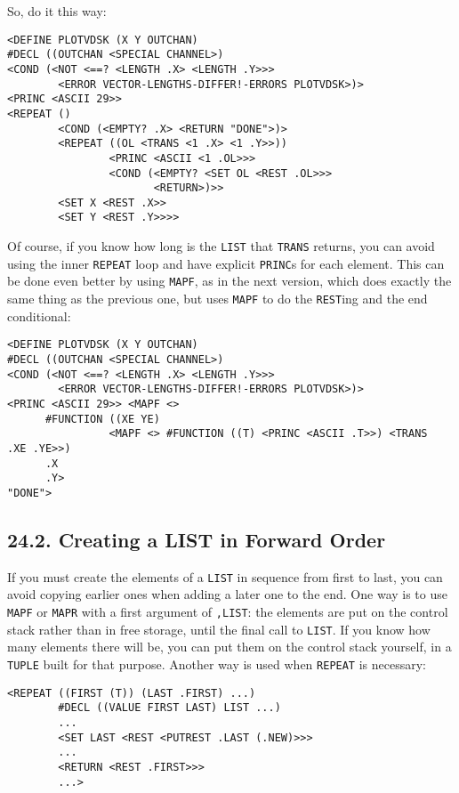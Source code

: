 \documentclass[a4paper,]{article}
\begin{document}
So, do it this way:

\begin{verbatim}
<DEFINE PLOTVDSK (X Y OUTCHAN)
#DECL ((OUTCHAN <SPECIAL CHANNEL>)
<COND (<NOT <==? <LENGTH .X> <LENGTH .Y>>>
        <ERROR VECTOR-LENGTHS-DIFFER!-ERRORS PLOTVDSK>)>
<PRINC <ASCII 29>>
<REPEAT ()
        <COND (<EMPTY? .X> <RETURN "DONE">)>
        <REPEAT ((OL <TRANS <1 .X> <1 .Y>>))
                <PRINC <ASCII <1 .OL>>>
                <COND (<EMPTY? <SET OL <REST .OL>>>
                       <RETURN>)>>
        <SET X <REST .X>>
        <SET Y <REST .Y>>>>
\end{verbatim}

Of course, if you know how long is the \texttt{LIST} that \texttt{TRANS} returns, you can avoid using the inner
\texttt{REPEAT} loop and have explicit \texttt{PRINC}s for each element. This can be done even better by using
\texttt{MAPF}, as in the next version, which does exactly the same thing as the previous one, but uses \texttt{MAPF} to do
the \texttt{REST}ing and the end conditional:

\begin{verbatim}
<DEFINE PLOTVDSK (X Y OUTCHAN)
#DECL ((OUTCHAN <SPECIAL CHANNEL>)
<COND (<NOT <==? <LENGTH .X> <LENGTH .Y>>>
        <ERROR VECTOR-LENGTHS-DIFFER!-ERRORS PLOTVDSK>)>
<PRINC <ASCII 29>> <MAPF <>
      #FUNCTION ((XE YE)
                <MAPF <> #FUNCTION ((T) <PRINC <ASCII .T>>) <TRANS
.XE .YE>>)
      .X
      .Y>
"DONE">
\end{verbatim}

\subsection{24.2. Creating a LIST in Forward Order}\label{creating-a-list-in-forward-order}

If you must create the elements of a \texttt{LIST} in sequence from first to last, you can avoid copying earlier ones when
adding a later one to the end. One way is to use \texttt{MAPF} or \texttt{MAPR} with a first argument of \texttt{,LIST}:
the elements are put on the control stack rather than in free storage, until the final call to \texttt{LIST}. If you know
how many elements there will be, you can put them on the control stack yourself, in a \texttt{TUPLE} built for that
purpose. Another way is used when \texttt{REPEAT} is necessary:

\begin{verbatim}
<REPEAT ((FIRST (T)) (LAST .FIRST) ...)
        #DECL ((VALUE FIRST LAST) LIST ...)
        ...
        <SET LAST <REST <PUTREST .LAST (.NEW)>>>
        ...
        <RETURN <REST .FIRST>>>
        ...>
\end{verbatim}
\end{document}
